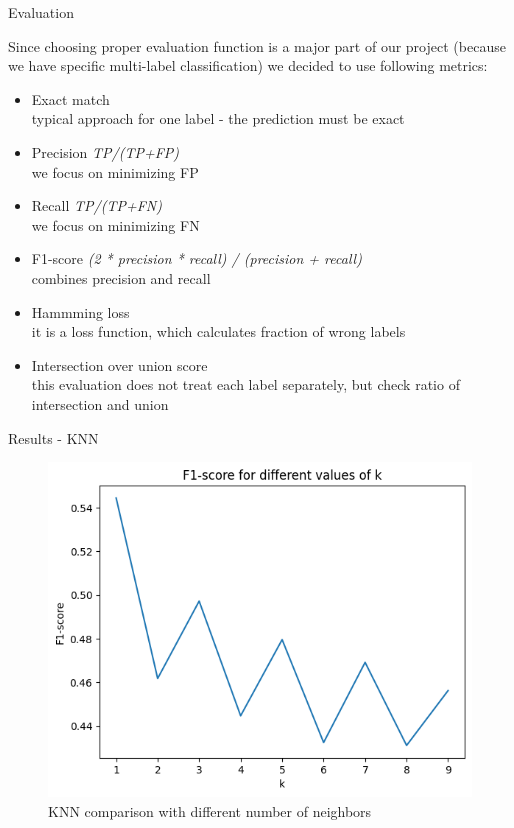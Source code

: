 \documentclass{beamer}
\begin{document}
\begin{frame}[t]{Evaluation}

\vspace{-3mm}

Since choosing proper evaluation function is a major part of our project (because we have specific multi-label classification) we decided to use following metrics:
	
\begin{itemize}
	
\pause
\item Exact match \\
typical approach for one label - the prediction must be exact
	
\pause
\item Precision {\it TP/(TP+FP)} \\
we focus on minimizing FP

\pause
\item Recall {\it TP/(TP+FN)} \\
we focus on minimizing FN

\pause
\item F1-score {\it (2 * precision * recall) / (precision + recall)} \\
combines precision and recall

\pause
\item Hammming loss \\
it is a loss function, which calculates fraction of wrong labels

\pause
\item Intersection over union score \\
this evaluation does not treat each label separately, but check ratio of intersection and union
\end{itemize}
\end{frame}


\begin{frame}[t]{Results - KNN}
	\vspace{-3mm}
	\begin{figure}[h]
		\caption{KNN comparison with different number of neighbors}
		\centering
		\includegraphics[width=0.73\linewidth]{images/KNN/f1_score_over_k.png}
	\end{figure}
\end{frame}
\end{document}
